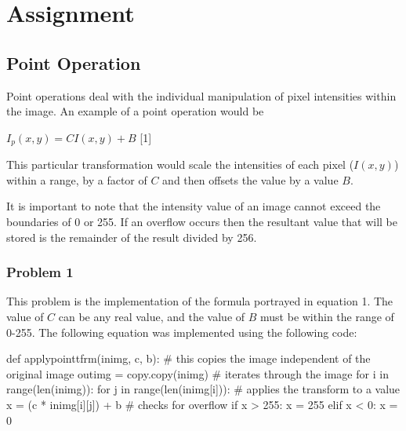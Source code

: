 \documentclass{article}
\begin{document}
\section{Assignment}

\subsection{Point Operation}

Point operations deal with the individual manipulation of pixel intensities within the image. An example of a point operation would be \newline


$I_{p}(x,y) = CI(x,y) + B$ [1] \newline


This particular transformation would scale the intensities of each pixel ($I(x,y)$) within a range, by a factor of $C$ and then offsets the value by a value $B$. \newline

It is important to note that the intensity value of an image cannot exceed the boundaries of 0 or 255. If an overflow occurs then the resultant value that will be stored is the remainder of the result divided by 256.

\subsubsection{Problem 1}

This problem is the implementation of the formula portrayed in equation 1. The value of $C$ can be any real value, and the value of $B$ must be within the range of 0-255. The following equation was implemented using the following code: \newline

\noindent def apply\textunderscore point\textunderscore tfrm(in\textunderscore img, c, b): \newline
	\indent \# this copies the image independent of the original image \newline
\indent	out\textunderscore img = copy.copy(in\textunderscore img)\newline
\newline
\indent	\# iterates through the image \newline
\indent	for i in range(len(in\textunderscore img)):\newline
\indent \indent	for j in range(len(in\textunderscore img[i])):\newline
\newline
\indent \indent \indent		\# applies the transform to a value \newline
\indent \indent \indent		x = (c * in\textunderscore img[i][j]) + b \newline
\newline
\indent \indent \indent		\# checks for overflow \newline
\indent \indent \indent		if x > 255: \newline
\indent \indent \indent \indent	x = 255 \newline
\indent \indent \indent 	elif x < 0: \newline
\indent \indent \indent \indent	x = 0 \newline
\end{document}
